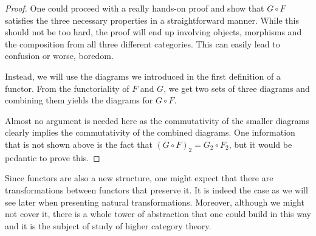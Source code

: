 \documentclass{article}
\theoremstyle{definition}
\theoremstyle{remark}
\begin{document}
\begin{proof}
	One could proceed with a really hands-on proof and show that $G \circ F$ satisfies the three necessary properties in a straightforward manner. While this should not be too hard, the proof will end up involving objects, morphisms and the composition from all three different categories. This can easily lead to confusion or worse, boredom.
	
	Instead, we will use the diagrams we introduced in the first definition of a functor. From the functoriality of $F$ and $G$, we get two sets of three diagrams and combining them yields the diagrams for $G \circ F$.
	
	\begin{figure}[h!]
		\centering
		\quad
		\quad
	\end{figure}

	Almost no argument is needed here as the commutativity of the smaller diagrams clearly implies the commutativity of the combined diagrams. One information that is not shown above is the fact that $(G\circ F)_2 = G_2 \circ F_2$, but it would be pedantic to prove this.
\end{proof}
Since functors are also a new structure, one might expect that there are transformations between functors that preserve it. It is indeed the case as we will see later when presenting natural transformations. Moreover, although we might not cover it, there is a whole tower of abstraction that one could build in this way and it is the subject of study of higher category theory.
\end{document}

